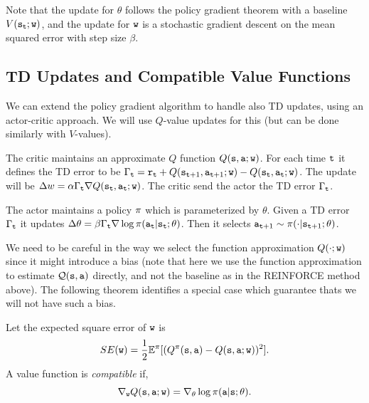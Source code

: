 Note that the update for $\theta$ follows the policy gradient theorem with a baseline $V({\tt s}_{\tt t};{\tt w})$, and the update for ${\tt w}$ is a stochastic gradient descent on the mean squared error with step size $\beta$.



\subsection{TD Updates and Compatible Value Functions}
We can extend the policy gradient algorithm to handle also TD updates, using an
actor-critic approach. We will use $Q$-value updates for this
(but can be done similarly with $V$-values).

The critic maintains an approximate $Q$ function $Q({\tt s},{\tt a};{\tt w})$. For each time ${\tt t}$ it defines the TD error to be $\Gamma_{\tt t} = {\tt r}_{\tt t} +Q({\tt s}_{{\tt t}+1},{\tt a}_{{\tt t}+1};{\tt w})-Q({\tt s}_{\tt t},{\tt a}_{\tt t};{\tt w})$. The update will be $\Delta w=\alpha\Gamma_{\tt t} \nabla Q({\tt s}_{\tt t},{\tt a}_{\tt t};{\tt w})$. The critic send the actor the TD error $\Gamma_{\tt t}$.

The actor maintains a policy $\pi$ which is parameterized by $\theta$. Given a TD error $\Gamma_{\tt t}$ it updates $\Delta \theta= \beta \Gamma_{\tt t} \nabla \log \pi({\tt a}_{\tt t}|{\tt s}_{\tt t};\theta)$. Then it selects ${\tt a}_{{\tt t}+1}\sim \pi(\cdot|{\tt s}_{{\tt t}+1};\theta)$.

We need to be careful in the way we select the function
approximation $Q(\cdot;{\tt w})$ since it might introduce a bias (note that here we use the function approximation to estimate $\mathcal{Q}({\tt s},{\tt a})$ directly, and not the baseline as in the REINFORCE method above).
The following theorem identifies a special case which guarantee
thats we will not have such a bias.

Let the expected square error of ${\tt w}$ is
\[
SE({\tt w})=\frac{1}{2}\mathbb{E}^\pi[(Q^\pi({\tt s},{\tt a})-Q({\tt s},{\tt a};{\tt w}))^2].
\]
A value function is {\em compatible} if,
\[
\nabla_{\tt w} Q({\tt s},{\tt a};{\tt w})= \nabla_\theta
\log \pi({\tt a}|{\tt s};\theta).
\]


